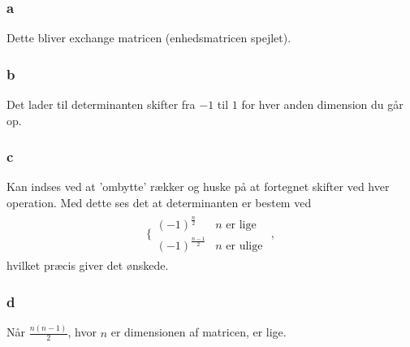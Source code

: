 			\subsubsection{a}

			Dette bliver exchange matricen (enhedsmatricen spejlet).

			\subsubsection{b}

			Det lader til determinanten skifter fra $-1$ til $1$ for hver anden dimension du går op.

			\subsubsection{c}

			Kan indses ved at 'ombytte' rækker og huske på at fortegnet skifter ved hver operation. Med dette ses det at determinanten er bestem ved
				\begin{align*}
					\bigg\{\begin{array}{ll}{(-1)^{\frac{n}{2}}} & {n \text { er lige }} \\ {(-1)^{\frac{n-1}{2}}} & {n \text { er ulige }}\end{array},
				\end{align*}
			hvilket præcis giver det ønskede.

			\subsubsection{d}

			Når $\frac{n(n-1)}{2}$, hvor $n$ er dimensionen af matricen, er lige.



